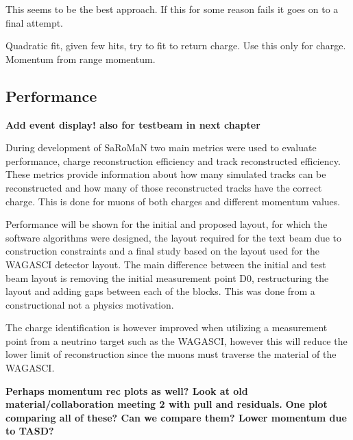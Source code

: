This seems to be the best approach. If this for some reason fails it goes on to a final attempt.

Quadratic fit, given few hits, try to fit to return charge. Use this only for charge. Momentum from range momentum.

\subsection{Performance}

\textbf{Add event display! also for testbeam in next chapter}

During development of SaRoMaN two main metrics were used to evaluate performance, charge reconstruction efficiency and track reconstructed efficiency. These metrics provide information about how many simulated tracks can be reconstructed and how many of those reconstructed tracks have the correct charge. This is done for muons of both charges and different momentum values.

Performance will be shown for the initial and proposed layout, for which the software algorithms were designed, the layout required for the text beam due to construction constraints and a final study based on the layout used for the WAGASCI detector layout. The main difference between the initial and test beam layout is removing the initial measurement point D0, restructuring  the layout and adding gaps between each of the blocks. This was done from a constructional not a physics motivation.

The charge identification is however improved when utilizing a measurement point from a neutrino target such as the WAGASCI, however this will reduce the lower limit of reconstruction since the muons must traverse the material of the WAGASCI. 

\textbf{Perhaps momentum rec plots as well? Look at old material/collaboration meeting 2 with pull and residuals.}
\textbf{One plot comparing all of these? Can we compare them? Lower momentum due to TASD?}

